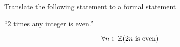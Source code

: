 \guard




\begin{exmp}
\label{exmp:translateQuantifiedStatements}
  Translate the following statement to a formal statement
	\begin{center}
		``$2$ times any integer is even.''
	\end{center}
	\[ \forall n\in\mathbb{Z}( 2n \text{ is even})\]
\end{exmp}
